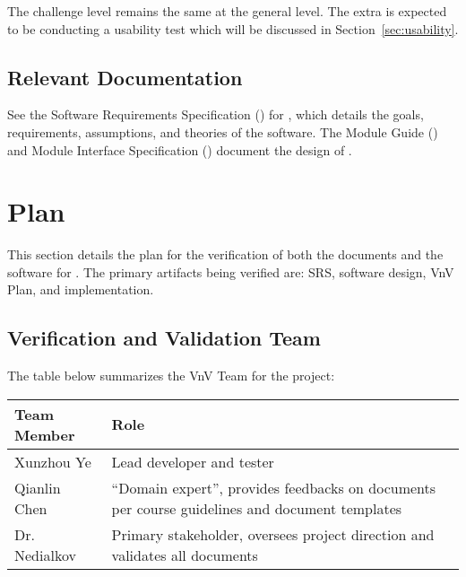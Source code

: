 \documentclass[12pt, titlepage]{article}
\begin{document}

The challenge level remains the same at the general level. The extra is expected
to be conducting a usability test which will be discussed in
Section~\ref{sec:usability}.

\subsection{Relevant Documentation}


See the Software Requirements Specification (\cite{SRS}) for \progname{}, which
details the goals, requirements, assumptions, and theories of the software. The
Module Guide (\cite{MG}) and Module Interface Specification (\cite{MIS}) document the
design of \progname{}.

\section{Plan}

This section details the plan for the verification of both the documents and the
software for \progname{}. The primary artifacts being verified are: SRS,
software design, VnV Plan, and implementation.

\subsection{Verification and Validation Team}

The table below summarizes the VnV Team for the project:

\vspace{5pt}

\begin{tabularx}{\linewidth}{lX}
  \toprule
  \textbf{Team Member} & \textbf{Role}                           \\
  \midrule
  Xunzhou Ye     & Lead developer and tester         \\
  Qianlin Chen   & ``Domain expert'', provides feedbacks on documents per course
                   guidelines and document templates \\
  Dr. Nedialkov  & Primary stakeholder, oversees project direction and validates
                   all documents                     \\
  \bottomrule
\end{tabularx}
\end{document}
